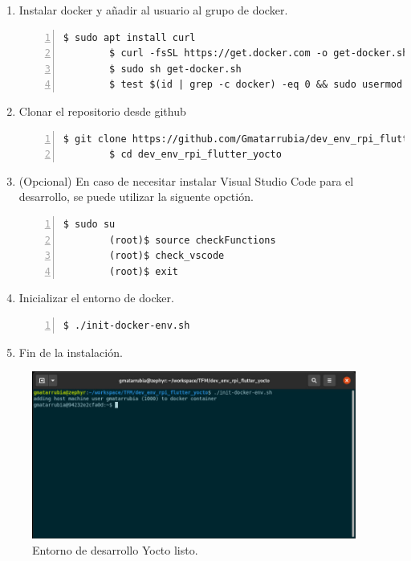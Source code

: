 \begin{enumerate}
    \item Instalar docker y añadir al usuario al grupo de docker.
    \begin{lstlisting}[style=consola, numbers=left]
        $ sudo apt install curl
        $ curl -fsSL https://get.docker.com -o get-docker.sh
        $ sudo sh get-docker.sh
        $ test $(id | grep -c docker) -eq 0 && sudo usermod -aG docker $(whoami)
    \end{lstlisting}

    \item Clonar el repositorio desde github
    \begin{lstlisting}[style=consola, numbers=left]
        $ git clone https://github.com/Gmatarrubia/dev_env_rpi_flutter_yocto.git
        $ cd dev_env_rpi_flutter_yocto
    \end{lstlisting}

    \item (Opcional) En caso de necesitar instalar Visual Studio Code para el desarrollo,
    se puede utilizar la siguente opctión.
    \begin{lstlisting}[style=consola, numbers=left]
        $ sudo su
        (root)$ source checkFunctions
        (root)$ check_vscode
        (root)$ exit
    \end{lstlisting}

    \item Inicializar el entorno de docker.
    \begin{lstlisting}[style=consola, numbers=left]
        $ ./init-docker-env.sh
    \end{lstlisting}

    \item Fin de la instalación.
\end{enumerate}

\begin{figure}[H]
    \centering
    \includegraphics[width=0.95\textwidth]{imgs/yocto-docker-ready}
    \caption[yocto docker ready]{Entorno de desarrollo Yocto listo.}
    \label{imgs:yocto-docker-ready}
\end{figure}

